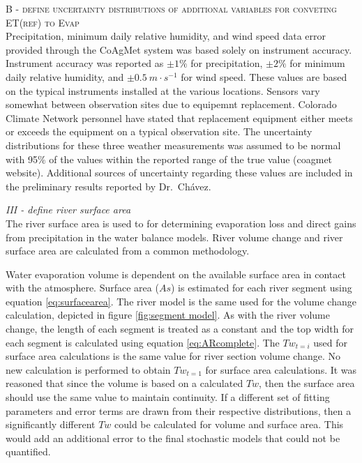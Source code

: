 \begin{linenumbers}
\textsc{B - define uncertainty distributions of additional variables for conveting ET(ref) to Evap}\\

Precipitation, minimum daily relative humidity, and wind speed data error provided through the CoAgMet system was based solely on instrument accuracy.  Instrument accuracy was reported as $\pm1\%$ for precipitation, $\pm2\%$ for minimum daily relative humidity, and $\pm0.5~m \cdot s^{-1}$ for wind speed.  These values are based on the typical instruments installed at the various locations.  Sensors vary somewhat between observation sites due to equipemnt replacement.  Colorado Climate Network personnel have stated that replacement equipment either meets or exceeds the equipment on a typical observation site.  The uncertainty distributions for these three weather measurements was assumed to be normal with 95\% of the values within the reported range of the true value (coagmet website).  Additional sources of uncertainty regarding these values are included in the preliminary results reported by Dr.\ Ch\'{a}vez.

\emph{III - define river surface area}\\

The river surface area is used to for determining evaporation loss and direct gains from precipitation in the water balance models.  River volume change and river surface area are calculated from a common methodology. 

Water evaporation volume is dependent on the available surface area in contact with the atmosphere.  Surface area ($As$) is estimated for each river segment using equation \ref{eq:surfacearea}.  The river model is the same used for the volume change calculation, depicted in figure \ref{fig:segment model}.  As with the river volume change, the length of each segment is treated as a constant and the top width for each segment is calculated using equation \ref{eq:ARcomplete}.  The $Tw_{t=i}$ used for surface area calculations is the same value for river section volume change.  No new calculation is performed to obtain $Tw_{t=1}$ for surface area calculations.  It was reasoned that since the volume is based on a calculated $Tw$, then the surface area should use the same value to maintain continuity.  If a different set of fitting parameters and error terms are drawn from their respective distributions, then a significantly different $Tw$ could be calculated for volume and surface area.  This would add an additional error to the final stochastic models that could not be quantified.


\end{linenumbers}
